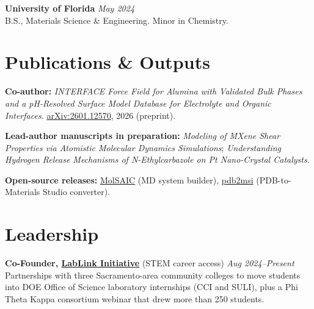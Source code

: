 \documentclass[letterpaper,10pt]{article}
\newcommand{\keepsection}{\needspace{6\baselineskip}}
\begin{document}
\textbf{University of Florida} \hfill \textit{May 2024}\\
B.S., Materials Science \& Engineering. Minor in Chemistry.

\keepsection\section*{Publications \& Outputs}
\textbf{Co-author:} \textit{INTERFACE Force Field for Alumina with Validated Bulk Phases and a pH-Resolved Surface Model Database for Electrolyte and Organic Interfaces.} \href{https://arxiv.org/abs/2601.12570}{arXiv:2601.12570}, 2026 (preprint).

\textbf{Lead-author manuscripts in preparation:} \textit{Modeling of MXene Shear Properties via Atomistic Molecular Dynamics Simulations}; \textit{Understanding Hydrogen Release Mechanisms of N-Ethylcarbazole on Pt Nano-Crystal Catalysts}.

\textbf{Open-source releases:} \href{https://github.com/fl-sean03/MolSAICV4}{MolSAIC} (MD system builder), \href{https://github.com/fl-sean03/pdb2msi}{pdb2msi} (PDB-to-Materials Studio converter).

\keepsection\section*{Leadership}
\textbf{Co-Founder, \href{https://www.lablinkinitiative.org}{LabLink Initiative}} (STEM career access) \hfill \textit{Aug 2024--Present}\\
Partnerships with three Sacramento-area community colleges to move students into DOE Office of Science laboratory internships (CCI and SULI), plus a Phi Theta Kappa consortium webinar that drew more than 250 students.
\end{document}
